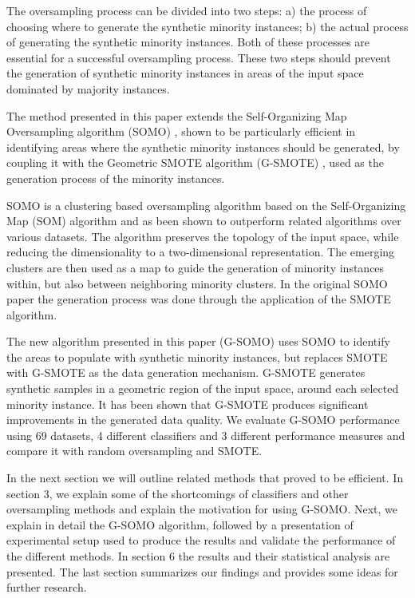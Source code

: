 \documentclass[parskip=full]{scrartcl}
\begin{document}
The oversampling process can be divided into two steps: a) the process of
choosing where to generate the synthetic minority instances; b) the actual
process of generating the synthetic minority instances. Both of these processes
are essential for a successful oversampling process. These two steps should
prevent the generation of synthetic minority instances in areas of the input
space dominated by majority instances.

The method presented in this paper extends the Self-Organizing Map Oversampling
algorithm (SOMO) \cite{Douzas2017}, shown to be particularly efficient in
identifying areas where the synthetic minority instances should be generated, by
coupling it with the Geometric SMOTE algorithm (G-SMOTE) \cite{Douzas2019}, used
as the generation process of the minority instances.

SOMO is a clustering based oversampling algorithm based on the Self-Organizing
Map (SOM) algorithm and as been shown to outperform related algorithms over
various datasets. The algorithm preserves the topology of the input space, while
reducing the dimensionality to a two-dimensional representation. The emerging
clusters are then used as a map to guide the generation of minority instances
within, but also between neighboring minority clusters. In the original SOMO
paper the generation process was done through the application of the SMOTE
algorithm.

The new algorithm presented in this paper (G-SOMO) uses SOMO to identify the
areas to populate with synthetic minority instances, but replaces SMOTE with
G-SMOTE as the data generation mechanism. G-SMOTE generates synthetic samples in
a geometric region of the input space, around each selected minority instance.
It has been shown that G-SMOTE produces significant improvements in the
generated data quality. We evaluate G-SOMO performance using 69 datasets, 4
different classifiers and 3 different performance measures and compare it with
random oversampling and SMOTE.

In the next section we will outline related methods that proved to be efficient.
In section 3, we explain some of the shortcomings of classifiers and other
oversampling methods and explain the motivation for using G-SOMO. Next, we
explain in detail the G-SOMO algorithm, followed by a presentation of
experimental setup used to produce the results and validate the performance of
the different methods. In section 6 the results and their statistical analysis
are presented. The last section summarizes our findings and provides some ideas
for further research.
\end{document}

